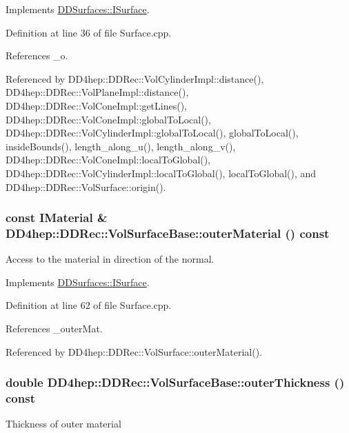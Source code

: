 Implements \hyperlink{class_d_d_surfaces_1_1_i_surface_a552cf76ca76154d0a6d9709d826b57f4}{DDSurfaces::ISurface}.

Definition at line 36 of file Surface.cpp.

References \_\-o.

Referenced by DD4hep::DDRec::VolCylinderImpl::distance(), DD4hep::DDRec::VolPlaneImpl::distance(), DD4hep::DDRec::VolConeImpl::getLines(), DD4hep::DDRec::VolConeImpl::globalToLocal(), DD4hep::DDRec::VolCylinderImpl::globalToLocal(), globalToLocal(), insideBounds(), length\_\-along\_\-u(), length\_\-along\_\-v(), DD4hep::DDRec::VolConeImpl::localToGlobal(), DD4hep::DDRec::VolCylinderImpl::localToGlobal(), localToGlobal(), and DD4hep::DDRec::VolSurface::origin().\hypertarget{class_d_d4hep_1_1_d_d_rec_1_1_vol_surface_base_a26269d37153a91b4f23ea05b97504ab4}{
\subsubsection[{outerMaterial}]{\setlength{\rightskip}{0pt plus 5cm}const {\bf IMaterial} \& DD4hep::DDRec::VolSurfaceBase::outerMaterial () const}}
\label{class_d_d4hep_1_1_d_d_rec_1_1_vol_surface_base_a26269d37153a91b4f23ea05b97504ab4}


Access to the material in direction of the normal. 

Implements \hyperlink{class_d_d_surfaces_1_1_i_surface_a49dfd8a5eef419226abc675b8d1126a5}{DDSurfaces::ISurface}.

Definition at line 62 of file Surface.cpp.

References \_\-outerMat.

Referenced by DD4hep::DDRec::VolSurface::outerMaterial().\hypertarget{class_d_d4hep_1_1_d_d_rec_1_1_vol_surface_base_a2b6e77c50e5b060711b9fcae604d5864}{
\subsubsection[{outerThickness}]{\setlength{\rightskip}{0pt plus 5cm}double DD4hep::DDRec::VolSurfaceBase::outerThickness () const}}
\label{class_d_d4hep_1_1_d_d_rec_1_1_vol_surface_base_a2b6e77c50e5b060711b9fcae604d5864}
Thickness of outer material 

